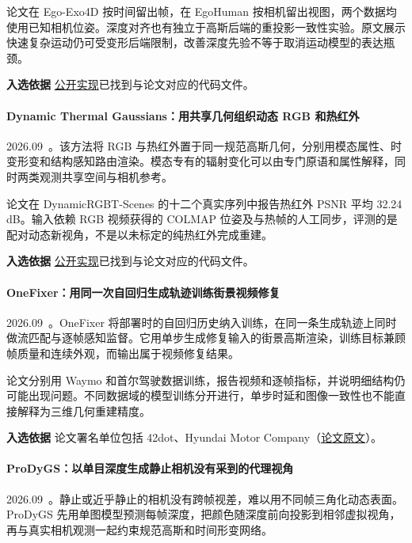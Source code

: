 论文在 Ego-Exo4D 按时间留出帧，在 EgoHuman 按相机留出视图，两个数据均使用已知相机位姿。深度对齐也有独立于高斯后端的重投影一致性实验。原文展示快速复杂运动仍可受变形后端限制，改善深度先验不等于取消运动模型的表达瓶颈。

\textbf{入选依据} \href{https://github.com/yongzhelyu/unifusion}{公开实现}已找到与论文对应的代码文件。

\paragraph{Dynamic Thermal Gaussians：用共享几何组织动态 RGB 和热红外}
2026.09~\cite{2609_24531}。该方法将 RGB 与热红外置于同一规范高斯几何，分别用模态属性、时变形变和结构感知路由渲染。模态专有的辐射变化可以由专门原语和属性解释，同时两类观测共享空间与相机参考。

论文在 DynamicRGBT-Scenes 的十二个真实序列中报告热红外 PSNR 平均 32.24 dB。输入依赖 RGB 视频获得的 COLMAP 位姿及与热帧的人工同步，评测的是配对动态新视角，不是以未标定的纯热红外完成重建。

\textbf{入选依据} \href{https://github.com/linlif1869/dtg}{公开实现}已找到与论文对应的代码文件。

\paragraph{OneFixer：用同一次自回归生成轨迹训练街景视频修复}
2026.09~\cite{2609_32175}。OneFixer 将部署时的自回归历史纳入训练，在同一条生成轨迹上同时做流匹配与逐帧感知监督。它用单步生成修复输入的街景高斯渲染，训练目标兼顾帧质量和连续外观，而输出属于视频修复结果。

论文分别用 Waymo 和首尔驾驶数据训练，报告视频和逐帧指标，并说明细结构仍可能出现问题。不同数据域的模型训练分开进行，单步时延和图像一致性也不能直接解释为三维几何重建精度。

\textbf{入选依据} 论文署名单位包括 42dot、Hyundai Motor Company（\href{https://arxiv.org/abs/2609.32175}{论文原文}）。

\paragraph{ProDyGS：以单目深度生成静止相机没有采到的代理视角}
2026.09~\cite{2609_32711}。静止或近乎静止的相机没有跨帧视差，难以用不同帧三角化动态表面。ProDyGS 先用单图模型预测每帧深度，把颜色随深度前向投影到相邻虚拟视角，再与真实相机观测一起约束规范高斯和时间形变网络。

